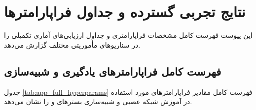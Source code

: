 \documentclass[oneside,openany,phd]{TMU-Thesis}
\begin{document}
\newpage

\chapter{نتایج تجربی گسترده و جداول فراپارامترها}
\label{chap:appendix_extended_results}

این پیوست فهرست کامل مشخصات فراپارامتری و جداول ارزیابی‌های آماری تکمیلی را در سناریوهای مأموریتی مختلف گزارش می‌دهد.

\section{فهرست کامل فراپارامترهای یادگیری و شبیه‌سازی}
\label{sec:app_hyperparameters}

جدول \ref{tab:app_full_hyperparams} فهرست کامل مقادیر فراپارامترهای مورد استفاده در آموزش شبکه عصبی و شبیه‌سازی بسترهای  و  را نشان می‌دهد.
\end{document}
